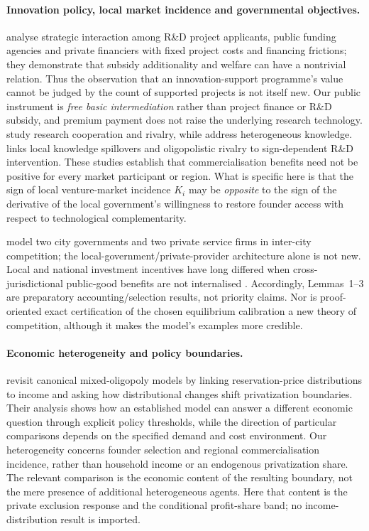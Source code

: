 \paragraph{Innovation policy, local market incidence and governmental objectives.}
\citet{TakaloTanayamaToivanen2013} analyse strategic interaction among R\&D project applicants, public funding agencies and private financiers with fixed project costs and financing frictions; they demonstrate that subsidy additionality and welfare can have a nontrivial relation. Thus the observation that an innovation-support programme's value cannot be judged by the count of supported projects is not itself new. Our public instrument is \emph{free basic intermediation} rather than project finance or R\&D subsidy, and premium payment does not raise the underlying research technology. \citet{DAspremontJacquemin1988,GoyalJoshi2003} study research cooperation and rivalry, while \citet{BerliantFujita2008,BerliantFujita2011} address heterogeneous knowledge. \citet{Lee2026} links local knowledge spillovers and oligopolistic rivalry to sign-dependent R\&D intervention. These studies establish that commercialisation benefits need not be positive for every market participant or region. What is specific here is that the sign of local venture-market incidence $K_i$ may be \emph{opposite} to the sign of the derivative of the local government's willingness to restore founder access with respect to technological complementarity.

\citet{LongWong2009} model two city governments and two private service firms in inter-city competition; the local-government/private-provider architecture alone is not new. Local and national investment incentives have long differed when cross-jurisdictional public-good benefits are not internalised \citep{CremerMarchandPestieau1997,MankiwWhinston1986}. Accordingly, Lemmas~1--3 are preparatory accounting/selection results, not priority claims. Nor is proof-oriented exact certification of the chosen equilibrium calibration a new theory of competition, although it makes the model's examples more credible.

\paragraph{Economic heterogeneity and policy boundaries.}
\citet{BenassiChircoColombo2025} revisit canonical mixed-oligopoly models by linking reservation-price distributions to income and asking how distributional changes shift privatization boundaries. Their analysis shows how an established model can answer a different economic question through explicit policy thresholds, while the direction of particular comparisons depends on the specified demand and cost environment. Our heterogeneity concerns founder selection and regional commercialisation incidence, rather than household income or an endogenous privatization share. The relevant comparison is the economic content of the resulting boundary, not the mere presence of additional heterogeneous agents. Here that content is the private exclusion response and the conditional profit-share band; no income-distribution result is imported.

